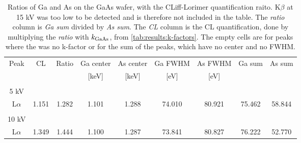 \begin{table}[ht]
    \centering
    \caption{
        Ratios of Ga and As on the GaAs wafer, with the CLiff-Lorimer quantification raito.
        K$\beta$ at 15 kV was too low to be detected and is therefore not included in the table.
        The \emph{ratio} column is \emph{Ga sum} divided by \emph{As sum}.
        The \emph{CL} column is the CL quantification, done by multiplying the \emph{ratio} with $k_\textnormal{GaAs}$, from \cref{tab:results:k-factors}.
        The empty cells are for peaks where the was no k-factor or for the sum of the peaks, which have no center and no FWHM.
    }
    \label{tab:results:ratios}
    \begin{tabular}{ccccccccc}

        Peak                         & CL    & Ratio & Ga center & As center & Ga FWHM & As FWHM & Ga sum  & As sum \\
                                     &       &       & [keV]     & [keV]     & [eV]    & [eV]    &         &        \\
        \hline
                                     &       &       &           &           &         &         &         &        \\

        5 kV                         &       &       &           &           &         &         &         &        \\
        L$\alpha$                    & 1.151 & 1.282 & 1.101     & 1.288     & 74.010  & 80.921  & 75.462  & 58.844 \\
        \hline
                                     &       &       &           &           &         &         &         &        \\
        10 kV                        &       &       &           &           &         &         &         &        \\
        L$\alpha$                    & 1.349 & 1.444 & 1.100     & 1.287     & 73.841  & 80.827  & 76.222  & 52.770 \\


\end{tabular}
\end{table}
